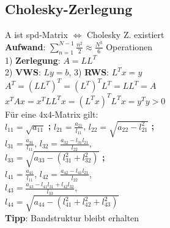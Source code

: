\subsection{Cholesky-Zerlegung}
A ist spd-Matrix $\Leftrightarrow$ Cholesky Z. existiert\\
\textbf{Aufwand}: $\sum_{n=1}^{N-1}\frac{n^2}{2} \approx \frac{N^3}{6}$ Operationen\\
1) \textbf{Zerlegung}: $A = LL^T$\\
2) \textbf{VWS}: $Ly = b$, 
3) \textbf{RWS}: $L^Tx = y$\\
$A^T = (LL^T)^T = (L^T)^TL^T = LL^T = A$\\
\mbox{$x^TAx = x^TLL^Tx = (L^Tx)^TL^Tx = y^Ty > 0$}\\
Für eine 4x4-Matrix gilt:\\
$l_{11} = \sqrt{a_{11}}$ \textbf{;} $l_{21} = \frac{a_{21}}{l_{11}}$, $l_{22} = \sqrt{a_{22} - l^2_{21}}$ \textbf{;}\\
$l_{31} = \frac{a_{31}}{l_{11}}$, $l_{32} = \frac{a_{32}-l_{31}l_{21}}{l_{22}}$,\\ $l_{33} = \sqrt{a_{33} - (l^2_{31} + l^2_{32})}$ \textbf{;}\\
$l_{41} = \frac{a_{41}}{l_{11}}$,
$l_{42} = \frac{a_{42}-l_{41}l_{21}}{l_{22}}$,\\
$l_{43} = \frac{a_{43}-l_{41}l_{31} + l_{42}l_{32}}{l_{33}}$,\\ $l_{44} = \sqrt{a_{44} - (l^2_{41} + l^2_{42} + l^2_{43})}$\\
\textbf{Tipp}: Bandstruktur bleibt erhalten
